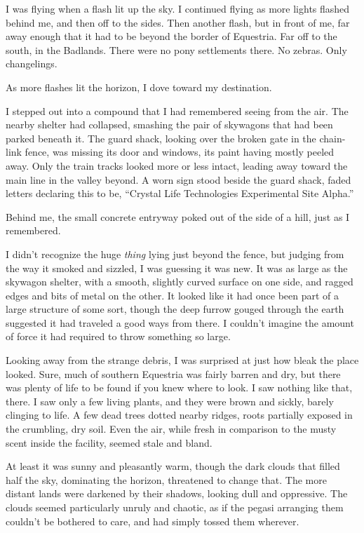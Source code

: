 I was flying when a flash lit up the sky. I continued flying as more lights flashed behind me, and then off to the sides. Then another flash, but in front of me, far away enough that it had to be beyond the border of Equestria. Far off to the south, in the Badlands. There were no pony settlements there. No zebras. Only changelings.

As more flashes lit the horizon, I dove toward my destination.

{\br}%
I stepped out into a compound that I had remembered seeing from the air. The nearby shelter had collapsed, smashing the pair of skywagons that had been parked beneath it. The guard shack, looking over the broken gate in the chain-link fence, was missing its door and windows, its paint having mostly peeled away. Only the train tracks looked more or less intact, leading away toward the main line in the valley beyond. A worn sign stood beside the guard shack, faded letters declaring this to be, “Crystal Life Technologies Experimental Site Alpha.”

Behind me, the small concrete entryway poked out of the side of a hill, just as I remembered.

I didn’t recognize the huge \textit{thing} lying just beyond the fence, but judging from the way it smoked and sizzled, I was guessing it was new. It was as large as the skywagon shelter, with a smooth, slightly curved surface on one side, and ragged edges and bits of metal on the other. It looked like it had once been part of a large structure of some sort, though the deep furrow gouged through the earth suggested it had traveled a good ways from there. I couldn’t imagine the amount of force it had required to throw something so large.

Looking away from the strange debris, I was surprised at just how bleak the place looked. Sure, much of southern Equestria was fairly barren and dry, but there was plenty of life to be found if you knew where to look. I saw nothing like that, there. I saw only a few living plants, and they were brown and sickly, barely clinging to life. A few dead trees dotted nearby ridges, roots partially exposed in the crumbling, dry soil. Even the air, while fresh in comparison to the musty scent inside the facility, seemed stale and bland.

At least it was sunny and pleasantly warm, though the dark clouds that filled half the sky, dominating the horizon, threatened to change that. The more distant lands were darkened by their shadows, looking dull and oppressive. The clouds seemed particularly unruly and chaotic, as if the pegasi arranging them couldn’t be bothered to care, and had simply tossed them wherever.

